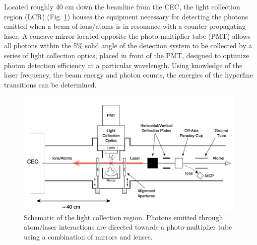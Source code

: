 Located roughly 40 cm down the beamline from the CEC, the light collection region (LCR) (Fig. \ref{LCR}) houses the equipment necessary for detecting the photons emitted when a beam of ions/atoms is in resonance with a counter propagating laser. A concave mirror located opposite the photo-multiplier tube (PMT) allows all photons within the 5\% solid angle of the detection system to be collected by a series of light collection optics, placed in front of the PMT, designed to optimize photon detection efficiency at a particular wavelength\cite{CFBS}. Using knowledge of the laser frequency, the beam energy and photon counts, the energies of the hyperfine transitions can be determined. 
\begin{figure}[t!]
\includegraphics[scale=0.35]{Laser_spec_triumf/LCR.png}
\caption[Schematic of the light collection region.]{\small Schematic of the light collection region. Photons emitted through atom/laser interactions are directed towards a photo-multiplier tube using a combination of mirrors and lenses\citep{CFBS}.}
\label{LCR}
\end{figure}
